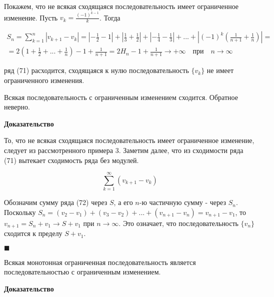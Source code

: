 \begin{exmpl}
	Покажем, что не всякая сходящаяся последовательность имеет ограниченное изменение. Пусть $v_k = \frac{(-1)^{k - 1}}{k}$. Тогда
	
	\begin{equation}
		\begin{gathered}
			S_n = \displaystyle\sum_{k = 1}^n |v_{k + 1} - v_k| = \left| -\frac{1}{2} - 1 \right| + \left| \frac{1}{3} + \frac{1}{2} \right| + \left| -\frac{1}{4} - \frac{1}{3} \right| + ... + \left| (-1)^k \left( \frac{1}{n + 1} + \frac{1}{n} \right) \right| = \\
			= 2\left( 1 + \frac{1}{2} + ... + \frac{1}{n} \right) - 1 + \frac{1}{n + 1} = 2H_n - 1 + \frac{1}{n + 1} \rightarrow +\infty \quad \mbox{при} \quad n \rightarrow \infty
		\end{gathered}
	\end{equation}
	
	ряд (71) расходится, сходящаяся к нулю последовательность $\{v_k\}$ не имеет ограниченного изменения.
\end{exmpl}

\begin{statm}
	Всякая последовательность с ограниченным изменением сходится. Обратное неверно.
\end{statm}
\textbf{Доказательство}

То, что не всякая сходящаяся последовательность имеет ограниченное изменение, следует из рассмотренного примера 3. Заметим далее, что из сходимости ряда (71) вытекает сходимость ряда без модулей.

\begin{equation}
	\displaystyle\sum_{k = 1}^\infty (v_{k + 1} - v_k)
\end{equation}

Обозначим сумму ряда (72) через $S$, а его $n$-ю частичную сумму - через $S_n$. Поскольку $S_n = (v_2 - v_1) + (v_3 - v_2) + ... + (v_{n + 1} - v_n) = v_{n + 1} - v_1$, то $v_{n + 1} = S_n + v_1 \rightarrow S + v_1$ при $n \rightarrow \infty$. Это означает, что последовательность $\{v_n\}$ сходится к пределу $S + v_1$.

\begin{flushright}
	$\blacksquare$
\end{flushright}

\begin{statm}
	Всякая монотонная ограниченная последовательность является последовательностью с ограниченным изменением.
\end{statm}
\textbf{Доказательство}

